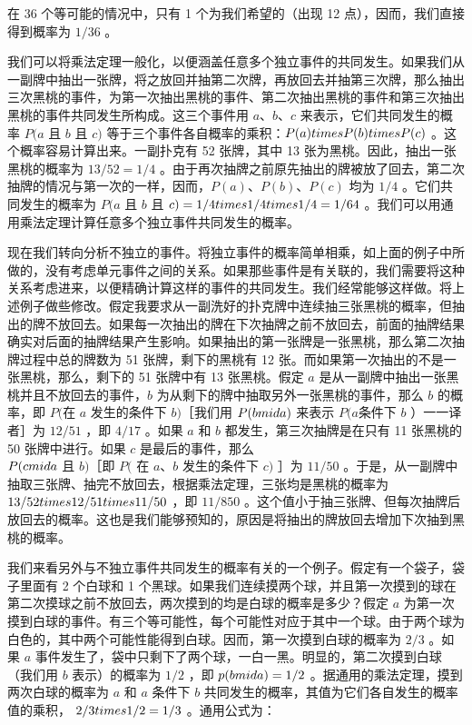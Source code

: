 在 36 个等可能的情况中，只有 1 个为我们希望的（出现 12 点），因而，我们直接得到概率为 $1 / 36$ 。

我们可以将乘法定理一般化，以便涵盖任意多个独立事件的共同发生。如果我们从一副牌中抽出一张牌，将之放回并抽第二次牌，再放回去并抽第三次牌，那么抽出三次黑桃的事件，为第一次抽出黑桃的事件、第二次抽出黑桃的事件和第三次抽出黑桃的事件共同发生所构成。这三个事件用 $a 、 b 、 c$ 来表示，它们共同发生的概率 $P(a$ 且 $b$ 且 $c)$ 等于三个事件各自概率的乘积：$P(a) \\times P(b) \\times P(c)$ 。这个概率容易计算出来。一副扑克有 52 张牌，其中 13 张为黑桃。因此，抽出一张黑桃的概率为 $13 / 52=1 / 4$ 。由于再次抽牌之前原先抽出的牌被放了回去，第二次抽牌的情况与第一次的一样，因而，$P(a) 、 P(b) 、 P(c)$ 均为 $1 / 4$ 。它们共同发生的概率为 $P(a$ 且 $b$ 且 $c)=1 / 4 \\times 1 / 4 \\times 1 / 4=1 / 64$ 。我们可以用通用乘法定理计算任意多个独立事件共同发生的概率。

现在我们转向分析不独立的事件。将独立事件的概率简单相乘，如上面的例子中所做的，没有考虑单元事件之间的关系。如果那些事件是有关联的，我们需要将这种关系考虑进来，以便精确计算这样的事件的共同发生。我们经常能够这样做。将上述例子做些修改。假定我要求从一副洗好的扑克牌中连续抽三张黑桃的概率，但抽出的牌不放回去。如果每一次抽出的牌在下次抽牌之前不放回去，前面的抽牌结果确实对后面的抽牌结果产生影响。如果抽出的第一张牌是一张黑桃，那么第二次抽牌过程中总的牌数为 51 张牌，剩下的黑桃有 12 张。而如果第一次抽出的不是一张黑桃，那么，剩下的 51 张牌中有 13 张黑桃。假定 $a$ 是从一副牌中抽出一张黑桃并且不放回去的事件，$b$ 为从剩下的牌中抽取另外一张黑桃的事件，那么 $b$ 的概率，即 $P($在 $a$ 发生的条件下 $b)$［我们用 $P(b \\mid a)$ 来表示 $P(a$条件下 $b$ ）一一译者］为 $12 / 51$ ，即 $4 / 17$ 。如果 $a$ 和 $b$ 都发生，第三次抽牌是在只有 11 张黑桃的 50 张牌中进行。如果 $c$ 是最后的事件，那么\\$P(c \\mid a$ 且 $b)$［即 $P($ 在 $a 、 b$ 发生的条件下 $c)$ ］为 $11 / 50$ 。于是，从一副牌中抽取三张牌、抽完不放回去，根据乘法定理，三张均是黑桃的概率为 $13 / 52 \\times 12 / 51 \\times 11 / 50$ ，即 $11 / 850$ 。这个值小于抽三张牌、但每次抽牌后放回去的概率。这也是我们能够预知的，原因是将抽出的牌放回去增加下次抽到黑桃的概率。

我们来看另外与不独立事件共同发生的概率有关的一个例子。假定有一个袋子，袋子里面有 2 个白球和 1 个黑球。如果我们连续摸两个球，并且第一次摸到的球在第二次摸球之前不放回去，两次摸到的均是白球的概率是多少？假定 $a$ 为第一次摸到白球的事件。有三个等可能性，每个可能性对应于其中一个球。由于两个球为白色的，其中两个可能性能得到白球。因而，第一次摸到白球的概率为 $2 / 3$ 。如果 $a$ 事件发生了，袋中只剩下了两个球，一白一黑。明显的，第二次摸到白球（我们用 $b$ 表示）的概率为 $1 / 2$ ，即 $p(b \\mid a)=1 / 2$ 。据通用的乘法定理，摸到两次白球的概率为 $a$ 和 $a$ 条件下 $b$ 共同发生的概率，其值为它们各自发生的概率值的乘积， $2 / 3 \\times 1 / 2=1 / 3$ 。通用公式为：

